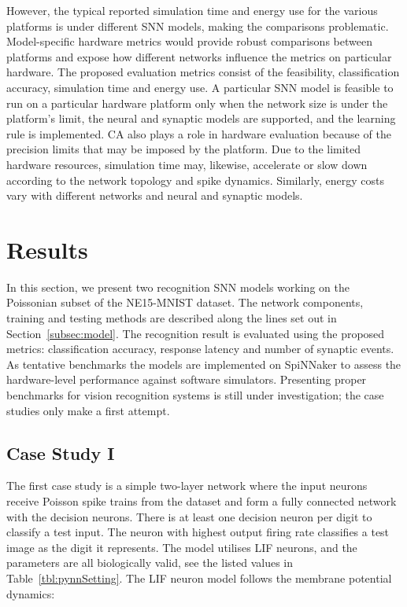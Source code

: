 \documentclass{frontiersENG} %
\begin{document}
However, the typical reported simulation time and energy use for the various platforms is under different SNN models, making the comparisons problematic.
Model-specific hardware metrics would provide robust comparisons between platforms and expose how different networks influence the metrics on particular hardware.
The proposed evaluation metrics consist of the feasibility, classification accuracy, simulation time and energy use.
A particular SNN model is feasible to run on a particular hardware platform only when the network size is under the platform's limit, the neural and synaptic models are supported, and the learning rule is implemented.
CA also plays a role in hardware evaluation because of the precision limits that may be imposed by the platform.
Due to the limited hardware resources, simulation time may, likewise, accelerate or slow down according to the network topology and spike dynamics.
Similarly, energy costs vary with different networks and neural and synaptic models.

\section{Results}
\label{sec:test}
In this section, we present two recognition SNN models working on the Poissonian subset of the NE15-MNIST dataset.
The network components, training and testing methods are described along the lines set out in Section~\ref{subsec:model}.
The recognition result is evaluated using the proposed metrics: classification accuracy, response latency and number of synaptic events.
As tentative benchmarks the models are implemented on SpiNNaker to assess the hardware-level performance against software simulators.
Presenting proper benchmarks for vision recognition systems is still under investigation; the case studies only make a first attempt.

\subsection{Case Study I}
The first case study is a simple two-layer network where the input neurons receive Poisson spike trains from the dataset and form a fully connected network with the decision neurons.
There is at least one decision neuron per digit to classify a test input.
The neuron with highest output firing rate classifies a test image as the digit it represents.
The model utilises LIF neurons, and the parameters are all biologically valid, see the listed values in Table~\ref{tbl:pynnSetting}.
The LIF neuron model follows the membrane potential dynamics:
\end{document}
